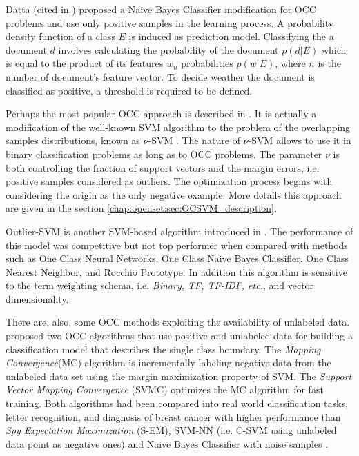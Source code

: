 Datta (cited in \parencite{manevitz2002one}) proposed a Naive Bayes Classifier modification for OCC problems and use only positive samples in the learning process. A probability density function of a class $E$ is induced as prediction model. Classifying the a document $d$ involves calculating the probability of the document $p(d|E)$ which is equal to the product of its features $w_{n}$ probabilities $p(w|E)$, where $n$ is the number of document's feature vector. To decide weather the document is classified as positive, a threshold is required to be defined. 

Perhaps the most popular OCC approach is described in \parencite{scholkopf1999estimating}. It is actually a modification of the well-known SVM algorithm to the problem of the overlapping samples distributions, known as $\nu$-SVM \parencite{bishop2006}. The nature of $\nu$-SVM allows to use it in binary classification problems as long as to OCC problems. The parameter $\nu$ is both controlling the fraction of support vectors and the margin errors, i.e. positive samples considered as outliers. The optimization process begins with considering the origin as the only negative example. More details this approach are given in the section \ref{chap:openset:sec:OCSVM_description}.

Outlier-SVM is another SVM-based algorithm introduced in \parencite{manevitz2002one,khan2010survey}. The performance of this model was competitive but not top performer when compared with methods such as One Class Neural Networks, One Class Naive Bayes Classifier, One Class Nearest Neighbor, and Rocchio Prototype. In addition this algorithm is sensitive to the term weighting schema, i.e. \textit{Binary, TF, TF-IDF, etc.}, and vector dimensionality. 

There are, also, some OCC methods exploiting the availability of unlabeled data. \parencite{yu2005single} proposed two OCC algorithms that use positive and unlabeled data for building a classification model that describes the single class boundary. The \textit{Mapping Convergence}(MC) algorithm is incrementally labeling negative data from the unlabeled data set using the margin maximization property of SVM. The \textit{Support Vector Mapping Convergence} (SVMC) optimizes the MC algorithm for fast training. Both algorithms had been compared into real world  classification tasks, letter recognition, and diagnosis of breast cancer with higher performance than \textit{Spy Expectation Maximization} (S-EM), SVM-NN (i.e. C-SVM using unlabeled data point as negative ones) and Naive Bayes Classifier with noise samples \parencite{liu2002partially, li2003learning}.

